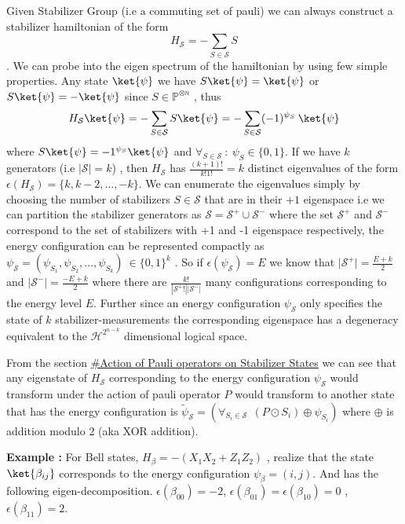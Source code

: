 \documentclass[
]{article}
\begin{document}
Given Stabilizer Group (i.e a commuting set of pauli) we can always
construct a stabilizer hamiltonian of the form
\[H_{\mathcal{S}}= - \sum\limits_{S \in \mathcal{S}} S\]. We can probe
into the eigen spectrum of the hamiltonian by using few simple
properties. Any state \(\ket{\psi}\) we have
\(S \ket{\psi} =\ket{\psi}\) or \(S \ket{\psi}=-\ket{\psi}\) since
\(S \in \mathbb{P}^{\otimes{n}}\) , thus
\[H_{\mathcal{S}}\ket{\psi}=- \sum\limits_{S \in \mathcal{S}}S \ket{\psi} = - \sum\limits_{S\in \mathcal{S}} (-1)^{\psi_{S}}\: \ket{\psi}\]
where \(S \ket{\psi} = -1^{\psi_{S}}\ket{\psi}\) and
\(\forall_{S \in \mathcal{S}} \:: \:\psi_{S}\in \{0,1\}\). If we have
\(k\) generators (i.e \(|\mathcal{S}|=k\)) , then \(H_{\mathcal{S}}\)
has \(\frac{(k+1)!}{k! 1!}=k\) distinct eigenvalues of the form
\(\epsilon(H_{\mathcal{S}}) =\{k, k-2, \dots ,-k\}\). We can enumerate
the eigenvalues simply by choosing the number of stabilizers
\(S \in \mathcal{S}\) that are in their \(+1\) eigenspace i.e we can
partition the stabilizer generators as
\(\mathcal{S} = \mathcal{S^{+}} \cup \mathcal{S^{-}}\) where the set
\(\mathcal{S^+}\) and \(\mathcal{S^{-}}\) correspond to the set of
stabilizers with +1 and -1 eigenspace respectively, the energy
configuration can be represented compactly as
\(\psi_\mathcal{S} = (\psi_{S_{1}}, \psi_{S_{2}}, \dots , \psi_{S_{k}})\:\in \{0,1\}^k\)
. So if \(\epsilon(\psi_{\mathcal{S}}) = E\) we know that
\(|\mathcal{S^{+}|}= \frac{E+k}{2}\) and
\(|\mathcal{S^-}|=\frac{-E+k}{2}\) where there are
\(\frac{k!}{|\mathcal{S}^{+}!||\mathcal{S}^{-}|}\) many configurations
corresponding to the energy level \(E\). Further since an energy
configuration \(\psi_{\mathcal{S}}\) only specifies the state of \(k\)
stabilizer-measurements the corresponding eigenspace has a degeneracy
equivalent to the \(\mathcal{H}^{2^{n-k}}\) dimensional logical space.

From the section
\protect\hyperlink{Actionux5cux2520ofux5cux2520Pauliux5cux2520operatorsux5cux2520onux5cux2520Stabilizerux5cux2520States.md}{\#Action
of Pauli operators on Stabilizer States} we can see that any eigenstate
of \(H_{\mathcal{S}}\) corresponding to the energy configuration
\(\psi_\mathcal{S}\) would transform under the action of pauli operator
\(P\) would transform to another state that has the energy configuration
is
\(\tilde{\psi}_\mathcal{S}= (\forall_{S_{i}\in \mathcal{S}} \: \: (P \odot S_{i})\oplus\psi_{S_{i}})\)
where \(\oplus\) is addition modulo 2 (aka XOR addition).

\textbf{Example :} For Bell states,
\(H_{\beta} = - (X_{1}X_{2} + Z_{1}Z_{2})\) , realize that the state
\(\ket{\beta_{ij}}\) corresponds to the energy configuration
\(\psi_{\beta}= (i,j)\). And has the following eigen-decomposition.
\(\epsilon(\beta_{00})=-2\),
\(\epsilon(\beta_{01}) = \epsilon(\beta_{10}) =0\)
,\(\epsilon(\beta_{11}) = 2\).
\end{document}
